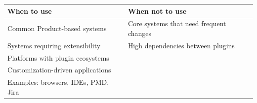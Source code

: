 \begin{table}[h!]
  \renewcommand{\arraystretch}{1.4}
  \centering
  \begin{tabular}{l l}
    \toprule
    \textbf{When to use}                & \textbf{When not to use}                \\
    \midrule
    Common Product-based systems        & Core systems that need frequent changes \\
    Systems requiring extensibility     & High dependencies between plugins       \\
    Platforms with plugin ecosystems    &                                         \\
    Customization-driven applications   &                                         \\
    Examples: browsers, IDEs, PMD, Jira &                                         \\
    \bottomrule
  \end{tabular}
\end{table}

